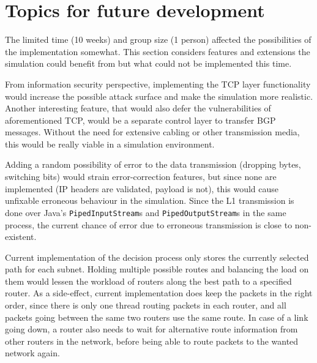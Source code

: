 \documentclass[11pt,a4paper,titlepage]{report}
\begin{document}
\section{Topics for future development}\label{sec:future}
The limited time (10 weeks) and group size (1 person) affected the possibilities of the implementation somewhat. This section considers features and extensions the simulation could benefit from but what could not be implemented this time.

From information security perspective, implementing the TCP layer functionality would increase the possible attack surface and make the simulation more realistic. Another interesting feature, that would also defer the vulnerabilities of aforementioned TCP, would be a separate control layer to transfer BGP messages. Without the need for extensive cabling or other transmission media, this would be really viable in a simulation environment.

Adding a random possibility of error to the data transmission (dropping bytes, switching bits) would strain error-correction features, but since none are implemented (IP headers are validated, payload is not), this would cause unfixable erroneous behaviour in the simulation. Since the L1 transmission is done over Java's \texttt{PipedInputStream}s and \texttt{PipedOutputStream}s in the same process, the current chance of error due to erroneous transmission is close to non-existent.

Current implementation of the decision process only stores the currently selected path for each subnet. Holding multiple possible routes and balancing the load on them would lessen the workload of routers along the best path to a specified router. As a side-effect, current implementation does keep the packets in the right order, since there is only one thread routing packets in each router, and all packets going between the same two routers use the same route. In case of a link going down, a router also needs to wait for alternative route information from other routers in the network, before being able to route packets to the wanted network again.
\end{document}
